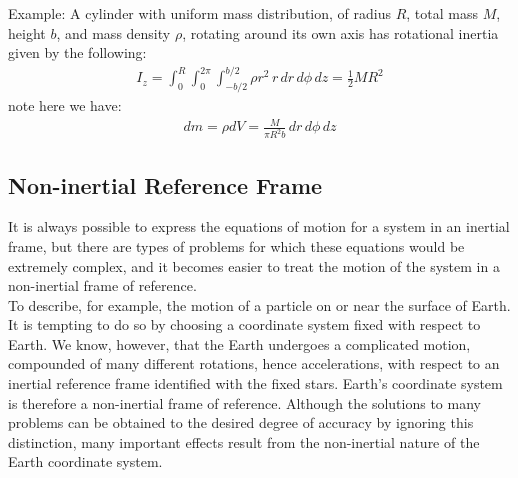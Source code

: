\documentclass[11pt,oneside]{book}
\theoremstyle{break}
\theoremstyle{break}
\newcommand{\example}{\color{green}Example: \color{black}}
\begin{document}
\example
A cylinder with uniform mass distribution, of radius $R$, total mass $M$, height $b$, and mass density $\rho$, rotating around its own axis has rotational inertia given by the following:
\begin{align*}
I_z = \int_0^R \int_0^{2\pi}\int_{-b/2}^{b/2} \rho r^2 \, r\, dr \, d\phi\, dz = \frac{1}{2}MR^2
\end{align*}
note here we have:
\begin{align*}
dm = \rho dV = \frac{M}{\pi R^2 b}\, dr\, d\phi\, dz
\end{align*}
\hfill\break\hfill\break\hfill\break

\subsection*{Non-inertial Reference Frame}
It is always possible to express the equations of motion for a system in an inertial frame, but there are types of problems for which these equations would be extremely complex, and it becomes easier to treat the motion of the system in a non-inertial frame of reference.\\

To describe, for example, the motion of a particle on or near the surface of Earth. It is tempting to do so by choosing a coordinate system fixed with respect to Earth. We know, however, that the Earth undergoes a complicated motion, compounded of many different rotations, hence accelerations, with respect to an inertial reference frame identified with the fixed stars. Earth's coordinate system is therefore a non-inertial frame of reference. Although  the solutions to many problems can be obtained to the desired degree of accuracy by ignoring this distinction, many important effects result from the non-inertial nature of the Earth coordinate system. \\
\end{document}
